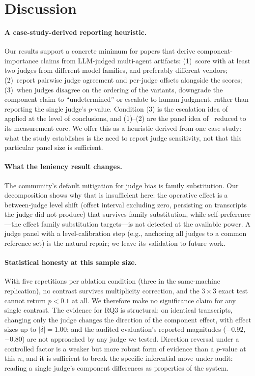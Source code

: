 \section{Discussion}
\label{sec:discussion}

\paragraph{A case-study-derived reporting heuristic.}
Our results support a concrete minimum for papers that derive
component-importance claims from LLM-judged multi-agent artifacts:
(1)~score with at least two judges from different model families, and
preferably different vendors; (2)~report pairwise judge agreement and
per-judge offsets alongside the scores; (3)~when judges disagree on the
ordering of the variants, downgrade the component claim to
``undetermined'' or escalate to human judgment, rather than reporting
the single judge's $p$-value. Condition (3) is the escalation idea
of~\cite{jung2024trust} applied at the level of conclusions, and (1)--(2)
are the panel idea of~\cite{verga2024juries} reduced to its
measurement core. We offer this as a heuristic derived from one case study: what the
study establishes is the need to report judge sensitivity, not that
this particular panel size is sufficient.

\paragraph{What the leniency result changes.}
The community's default mitigation for judge bias is family
substitution. Our decomposition shows why that is insufficient here:
the operative effect is a between-judge level shift (offset interval
excluding zero, persisting on transcripts the judge did not produce)
that survives family substitution, while self-preference---the effect
family substitution targets---is not detected at the available power. A
judge panel with a level-calibration step (e.g., anchoring all judges
to a common reference set) is the natural repair; we leave its
validation to future work.

\paragraph{Statistical honesty at this sample size.}
With five repetitions per ablation condition (three in the same-machine
replication), no contrast survives multiplicity correction, and the
$3\times3$ exact test cannot return $p<0.1$ at all. We therefore make
no significance claim for any single contrast. The evidence for RQ3 is
structural: on identical transcripts, changing only the judge changes
the direction of the component effect, with effect sizes up to
$\lvert\delta\rvert=1.00$; and the audited evaluation's reported
magnitudes ($-0.92$, $-0.80$) are not approached by any judge we
tested. Direction reversal under a controlled factor is a weaker but
more robust form of evidence than a $p$-value at this $n$, and it is
sufficient to break the specific inferential move under audit: reading
a single judge's component differences as properties of the system.

